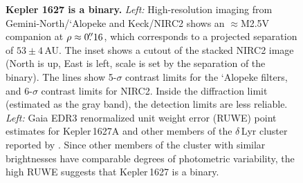 \documentclass[12pt,modern,twocolumn,tighten]{aastex63}
\begin{document}
\begin{figure}[tp]
	\begin{center}
		\leavevmode
	\end{center}
	\vspace{-0.5cm}
	\caption{
    {\bf Kepler 1627 is a binary.} {\it Left:} High-resolution imaging
    from Gemini-North/`Alopeke and Keck/NIRC2 shows an $\approx$M2.5V
    companion at $\rho \approx 0\mbox{$.\!\!^{\prime\prime}$}16$, which corresponds to a
    projected separation of $53\pm4$\,AU.  The inset shows a cutout of
    the stacked NIRC2 image (North is up, East is left, scale is set by the
    separation of the binary).  The lines show 5-$\sigma$ contrast
    limits for the `Alopeke filters, and 6-$\sigma$ contrast limits
    for NIRC2.  Inside the diffraction limit (estimated as the gray
    band), the detection limits are less reliable.  {\it Left:} Gaia
    EDR3 renormalized unit weight error (RUWE) point estimates for
    Kepler\,1627A and other members of the $\delta$\,Lyr cluster
    reported by \citet{KounkelCovey2019}.  Since other members of the
    cluster with similar brightnesses have comparable degrees of
    photometric variability, the high RUWE suggests that Kepler\,1627
    is a binary. 
    \label{fig:kep1627binary}
	}
\end{figure}
\end{document}
